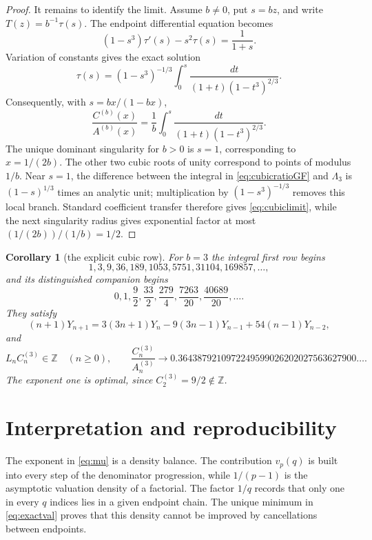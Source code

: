 \documentclass[11pt]{article}
\newtheorem{corollary}[theorem]{Corollary}
\theoremstyle{remark}
\newcommand{\Z}{\mathbb Z}
\begin{document}
\begin{proof}
It remains to identify the limit.  Assume $b\ne0$, put $s=bz$, and write
$T(z)=b^{-1}\tau(s)$.  The endpoint differential equation becomes
\[
 (1-s^3)\tau'(s)-s^2\tau(s)=\frac1{1+s}.
\]
Variation of constants gives the exact solution
\begin{equation}\label{eq:cubicvariation}
 \tau(s)=(1-s^3)^{-1/3}
 \int_0^s\frac{dt}{(1+t)(1-t^3)^{2/3}}.
\end{equation}
Consequently, with $s=bx/(1-bx)$,
\begin{equation}\label{eq:cubicratioGF}
 \frac{C^{(b)}(x)}{A^{(b)}(x)}
 =\frac1b\int_0^s\frac{dt}{(1+t)(1-t^3)^{2/3}}.
\end{equation}
The unique dominant singularity for $b>0$ is $s=1$, corresponding to
$x=1/(2b)$.  The other two cubic roots of unity correspond to points of
modulus $1/b$.  Near $s=1$, the difference between the integral in
\eqref{eq:cubicratioGF} and $\Lambda_3$ is
$(1-s)^{1/3}$ times an analytic unit; multiplication by
$(1-s^3)^{-1/3}$ removes this local branch.  Standard coefficient transfer
therefore gives \eqref{eq:cubiclimit}, while the next singularity radius
gives exponential factor at most $(1/(2b))/(1/b)=1/2$.
\end{proof}

\begin{corollary}[the explicit cubic row]\label{cor:cubic3}
For $b=3$ the integral first row begins
\[
 1,3,9,36,189,1053,5751,31104,169857,\ldots,
\]
and its distinguished companion begins
\[
 0,1,\frac92,\frac{33}2,\frac{279}4,
 \frac{7263}{20},\frac{40689}{20},\ldots.
\]
They satisfy
\[
 (n+1)Y_{n+1}=3(3n+1)Y_n-9(3n-1)Y_{n-1}
                  +54(n-1)Y_{n-2},
\]
and
\[
 L_nC^{(3)}_n\in\Z\quad(n\ge0),
 \qquad
 \frac{C^{(3)}_n}{A^{(3)}_n}\longrightarrow
 0.3643879210972249599026202027563627900\ldots.
\]
The exponent one is optimal, since $C^{(3)}_2=9/2\notin\Z$.
\end{corollary}

\section{Interpretation and reproducibility}

The exponent in \eqref{eq:mu} is a density balance.  The contribution
$v_p(q)$ is built into every step of the denominator progression, while
$1/(p-1)$ is the asymptotic valuation density of a factorial.  The factor
$1/q$ records that only one in every $q$ indices lies in a given endpoint
chain.  The unique minimum in \eqref{eq:exactval} proves that this density
cannot be improved by cancellations between endpoints.
\end{document}

